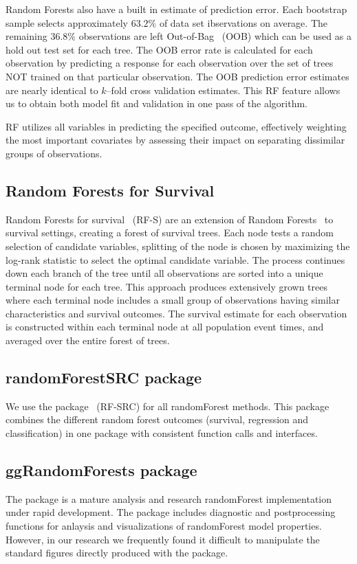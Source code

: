 \documentclass[nojss,letterpaper]{jss}\usepackage[]{graphicx}\usepackage[]{color}
\begin{document}
Random Forests also have a built in estimate of prediction error. Each bootstrap sample selects approximately $63.2\%$ of data set ibservations on average. The remaining $36.8\%$ observations are left Out-of-Bag~\citep{BreimanOOB:1996e} (OOB) which can be used as a hold out test set for each tree. The OOB error rate is calculated for each observation by predicting a response for each observation over the set of trees NOT trained on that particular observation. The OOB prediction error estimates are nearly identical to $k$--fold cross validation estimates. This RF feature allows us to obtain both model fit and validation in one pass of the algorithm.

RF utilizes all variables in predicting the specified outcome, effectively weighting the most important covariates by assessing their impact on separating dissimilar groups of observations. 

\subsection{Random Forests for Survival}\label{S:rfs}
Random Forests for survival~\citep{Ishwaran:2007,Ishwaran:2008} (RF-S) are an extension of Random Forests~\citep{Breiman:2001} to survival settings, creating a forest of survival trees. Each node tests a random selection of candidate variables, splitting of the node is chosen by maximizing the log-rank statistic to select the optimal candidate variable. The process continues down each branch of the tree until all observations are sorted into a unique terminal node for each tree. This approach produces extensively grown trees where each terminal node includes a small group of observations having similar characteristics and survival outcomes. The survival estimate for each observation is constructed within each terminal node at all population event times, and averaged over the entire forest of trees.

\subsection{randomForestSRC package}
We use the  package~\citep{Ishwaran:RFSRC:2014} (RF-SRC) for all randomForest methods. This package combines the different random forest outcomes (survival, regression and classification) in one package with consistent function calls and interfaces. 

\subsection{ggRandomForests package}
The  package is a mature analysis and research randomForest implementation under rapid development. The package includes diagnostic  and postprocessing functions for anlaysis and visualizations of randomForest model properties. However, in our research we frequently found it difficult to manipulate the standard figures directly produced with the  package. 
\end{document}
